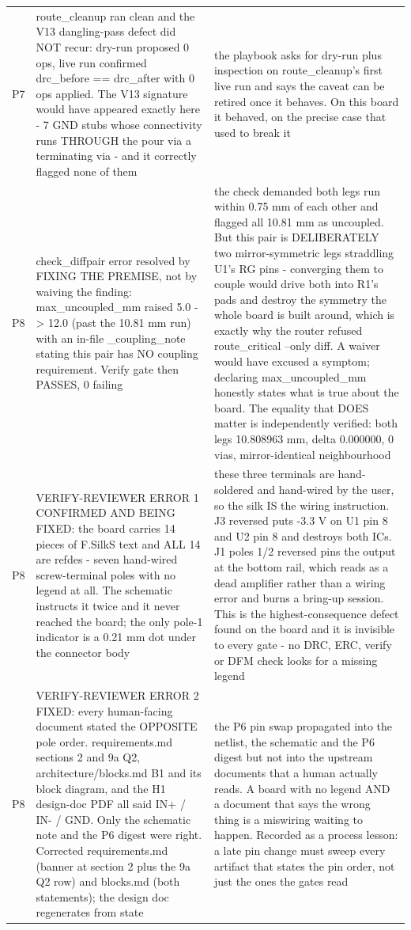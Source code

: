\documentclass[11pt,a4paper]{article}
\begin{document}
{\begin{longtable}{lp{5.2cm}p{7.2cm}}
P7 & route\_cleanup ran clean and the V13 dangling-pass defect did NOT recur: dry-run proposed 0 ops, live run confirmed drc\_before == drc\_after with 0 ops applied. The V13 signature would have appeared exactly here - 7 GND stubs whose connectivity runs THROUGH the pour via a terminating via - and it correctly flagged none of them & the playbook asks for dry-run plus inspection on route\_cleanup's first live run and says the caveat can be retired once it behaves. On this board it behaved, on the precise case that used to break it \\
P8 & check\_diffpair error resolved by FIXING THE PREMISE, not by waiving the finding: max\_uncoupled\_mm raised 5.0 -\textgreater{} 12.0 (past the 10.81 mm run) with an in-file \_coupling\_note stating this pair has NO coupling requirement. Verify gate then PASSES, 0 failing & the check demanded both legs run within 0.75 mm of each other and flagged all 10.81 mm as uncoupled. But this pair is DELIBERATELY two mirror-symmetric legs straddling U1's RG pins - converging them to couple would drive both into R1's pads and destroy the symmetry the whole board is built around, which is exactly why the router refused route\_critical --only diff. A waiver would have excused a symptom; declaring max\_uncoupled\_mm honestly states what is true about the board. The equality that DOES matter is independently verified: both legs 10.808963 mm, delta 0.000000, 0 vias, mirror-identical neighbourhood \\
P8 & VERIFY-REVIEWER ERROR 1 CONFIRMED AND BEING FIXED: the board carries 14 pieces of F.SilkS text and ALL 14 are refdes - seven hand-wired screw-terminal poles with no legend at all. The schematic instructs it twice and it never reached the board; the only pole-1 indicator is a 0.21 mm dot under the connector body & these three terminals are hand-soldered and hand-wired by the user, so the silk IS the wiring instruction. J3 reversed puts -3.3 V on U1 pin 8 and U2 pin 8 and destroys both ICs. J1 poles 1/2 reversed pins the output at the bottom rail, which reads as a dead amplifier rather than a wiring error and burns a bring-up session. This is the highest-consequence defect found on the board and it is invisible to every gate - no DRC, ERC, verify or DFM check looks for a missing legend \\
P8 & VERIFY-REVIEWER ERROR 2 FIXED: every human-facing document stated the OPPOSITE pole order. requirements.md sections 2 and 9a Q2, architecture/blocks.md B1 and its block diagram, and the H1 design-doc PDF all said IN+ / IN- / GND. Only the schematic note and the P6 digest were right. Corrected requirements.md (banner at section 2 plus the 9a Q2 row) and blocks.md (both statements); the design doc regenerates from state & the P6 pin swap propagated into the netlist, the schematic and the P6 digest but not into the upstream documents that a human actually reads. A board with no legend AND a document that says the wrong thing is a miswiring waiting to happen. Recorded as a process lesson: a late pin change must sweep every artifact that states the pin order, not just the ones the gates read \\

\end{longtable}}
\end{document}
